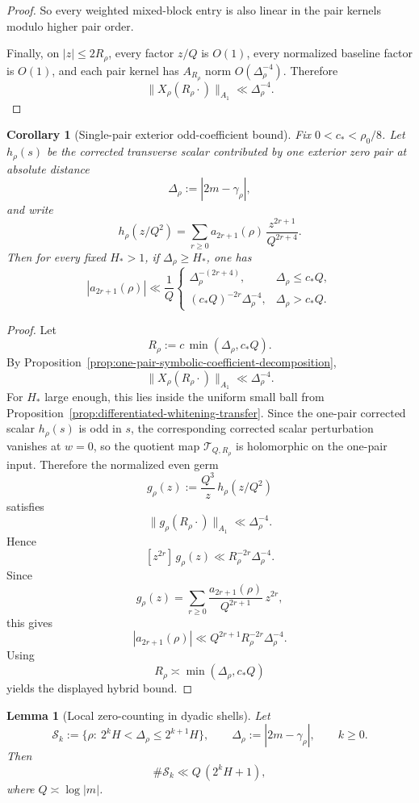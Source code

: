 \documentclass[11pt,a4paper]{amsart}
\theoremstyle{plain}
\newtheorem{lemma}[theorem]{Lemma}
\newtheorem{corollary}[theorem]{Corollary}
\theoremstyle{definition}
\begin{document}
\begin{proof}
So every weighted mixed-block entry is also linear in the pair kernels modulo
higher pair order.

Finally, on $|z|\le 2R_\rho$, every factor $z/Q$ is $O(1)$, every
normalized baseline factor is $O(1)$, and each pair kernel has $A_{R_\rho}$
norm $O(\Delta_\rho^{-4})$. Therefore
\[
\|X_\rho(R_\rho\cdot)\|_{A_1}\ll \Delta_\rho^{-4}.
\]
\end{proof}

\begin{corollary}[Single-pair exterior odd-coefficient bound]
\label{cor:single-pair-odd-jet}
Fix $0<c_*<\rho_0/8$. Let $h_\rho(s)$ be the corrected transverse scalar
contributed by one exterior zero pair at absolute distance
\[
\Delta_\rho:=|2m-\gamma_\rho|,
\]
and write
\[
h_\rho(z/Q^2)
=
\sum_{r\ge 0} a_{2r+1}(\rho)\,\frac{z^{2r+1}}{Q^{2r+4}}.
\]
Then for every fixed $H_*>1$, if $\Delta_\rho\ge H_*$, one has
\[
\boxed{
|a_{2r+1}(\rho)|
\ll
\frac{1}{Q}
\begin{cases}
\Delta_\rho^{-(2r+4)}, & \Delta_\rho\le c_*Q,\\[1ex]
(c_*Q)^{-2r}\Delta_\rho^{-4}, & \Delta_\rho>c_*Q.
\end{cases}
}
\]
\end{corollary}

\begin{proof}
Let
\[
R_\rho:=c\,\min(\Delta_\rho,c_*Q).
\]
By Proposition~\ref{prop:one-pair-symbolic-coefficient-decomposition},
\[
\|X_\rho(R_\rho\cdot)\|_{A_1}\ll \Delta_\rho^{-4}.
\]
For $H_*$ large enough, this lies inside the uniform small ball from
Proposition~\ref{prop:differentiated-whitening-transfer}. Since the one-pair
corrected scalar $h_\rho(s)$ is odd in $s$, the corresponding corrected
scalar perturbation vanishes at $w=0$, so the quotient map
$\mathcal T_{Q,R_\rho}$ is holomorphic on the one-pair input. Therefore the
normalized even germ
\[
g_\rho(z):=\frac{Q^3}{z}\,h_\rho(z/Q^2)
\]
satisfies
\[
\|g_\rho(R_\rho\cdot)\|_{A_1}\ll \Delta_\rho^{-4}.
\]
Hence
\[
[z^{2r}]\,g_\rho(z)\ll R_\rho^{-2r}\Delta_\rho^{-4}.
\]
Since
\[
g_\rho(z)=\sum_{r\ge 0}\frac{a_{2r+1}(\rho)}{Q^{2r+1}}\,z^{2r},
\]
this gives
\[
|a_{2r+1}(\rho)|\ll Q^{2r+1}R_\rho^{-2r}\Delta_\rho^{-4}.
\]
Using
\[
R_\rho\asymp \min(\Delta_\rho,c_*Q)
\]
yields the displayed hybrid bound.
\end{proof}

\begin{lemma}[Local zero-counting in dyadic shells]
\label{lem:dyadic-shell-count}
Let
\[
\mathcal S_k:=\{\rho:\ 2^kH<\Delta_\rho\le 2^{k+1}H\},
\qquad
\Delta_\rho:=|2m-\gamma_\rho|,
\qquad
k\ge 0.
\]
Then
\[
\#\mathcal S_k\ll Q\,(2^kH+1),
\]
where $Q\asymp \log|m|$.
\end{lemma}
\end{document}
